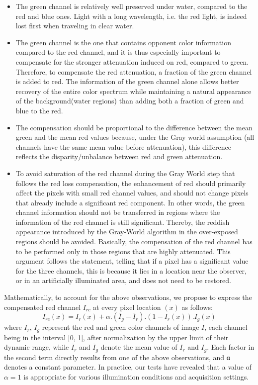\documentclass[hidelinks, 12pt]{report}
\begin{document}
\begin{itemize}
\item{The green channel is relatively well preserved under water, compared to the red and blue ones. Light with a long wavelength, i.e. the red light, is indeed lost first when traveling in clear water.}
\item{The green channel is the one that contains opponent color information compared to the red channel, and it is thus especially important to compensate for the stronger attenuation induced on red, compared to green. Therefore, to compensate the red attenuation, a fraction of the green channel is added to red. The information of the green channel alone allows better recovery of the entire color spectrum while maintaining a natural appearance of the background(water regions) than adding both a fraction of green and blue to the red.}
\item{The compensation should be proportional to the difference between the mean green and the mean red values because, under the Gray world assumption (all channels have the same mean value before attenuation), this difference reflects the disparity/unbalance between red and green attenuation.}
\item{To avoid saturation of the red channel during the Gray World step that follows the red loss compensation, the enhancement of red should primarily affect the pixels with small red channel values, and should not change pixels that already include a significant red component. In other words, the green channel information should not be transferred in regions where the information of the red channel is still significant. Thereby, the reddish appearance introduced by the Gray-World algorithm in the over-exposed regions should be avoided. Basically, the compensation of the red channel has to be performed only in those regions that are highly attenuated. This argument follows the statement, telling that if a pixel has a significant value for the three channels, this is because it lies in a location near the observer, or in an artificially illuminated area, and does not need to be restored.}
\end{itemize}
Mathematically, to account for the above observations, we propose to express the compensated red channel $I_{rc}$ at every pixel location $(x)$ as follows:
\begin{equation}
I_{rc}(x)=I_r(x)+\alpha.(\overline{I}_g-\overline{I}_r).(1-I_r(x)).I_g(x)
\end{equation}
where $I_r$, $I_g$ represent the red and green color channels of image $I$, each channel being in the interval [0, 1], after normalization by the upper limit of their dynamic range, while $\overline{I}_r$ and $\overline{I}_g$ denote the mean value of $I_r$ and $I_g$. Each factor in the second term directly results from one of the above observations, and α denotes a constant parameter. In practice, our tests have revealed that a value of $\alpha=1$ is appropriate for various illumination conditions and acquisition settings.\\
\end{document}
